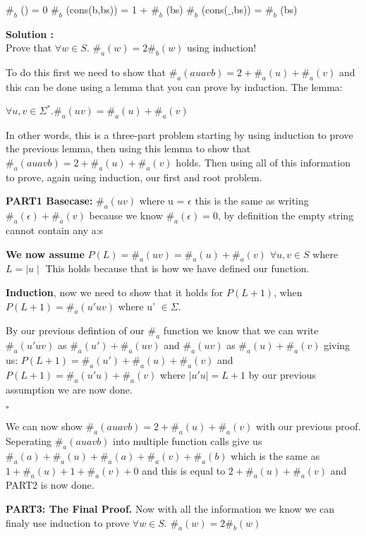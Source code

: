 \documentclass{article}
\newcounter{problem}
\newcounter{solution}
\newcommand\ASolution{%
  \stepcounter{solution}%
  \textbf{Solution \thesolution:}\\%
}
\begin{document}
$\#_b$ ()              = 0 \newline
$\#_b$ (cons(b,bs))    = 1 + $\#_b$ (bs) \newline
$\#_b$ (cons($\_$,bs)) = $\#_b$ (bs)

\ASolution Prove that $\forall w \in S$. $ \#_a (w) = 2\#_b (w)$ using induction!

To do this first we need to show that $\#_a (auavb) = 2 + \#_a(u) + \#_a(v)$ and this can be done using a lemma that you can prove by induction. The lemma: 
\begin{center}
    $\forall u,v \in \Sigma^*. \#_a (uv) = \#_a(u) + \#_a(v)$
\end{center}

In other words, this is a three-part problem starting by using induction to prove the previous lemma, then using this lemma to show that $\#_a (auavb) = 2 + \#_a(u) + \#_a(v)$ holds. Then using all of this information to prove, again using induction, our first and root problem.

\textbf{PART1 Basecase:} \newline
$\#_a (uv)$ where u = $\epsilon$ this is the same as writing $\#_a(\epsilon) + 
\#_a(v)$ because we know $\#_a(\epsilon) = 0$, by definition the empty string 
cannot contain any a:s

\textbf{We now assume} $P(L) = \#_a (uv) = \#_a (u) + \#_a (v)$ $\forall u,v \in S$ where $L = \mid u \mid$ This holds because that is how we have defined our function.

\textbf{Induction}, now we need to show that it holds for $P(L+1)$, when $P(L+1) = \#_a (u'uv)$ where u' $\in \Sigma$.

By our previous defintion of our $\#_a$ function we know that we can write 
$\#_a(u'uv)$ as $\#_a(u') + \#_a(uv)$ and $\#_a(uv)$ as $\#_a(u) + \#_a(v)$ giving 
us: $P(L+1) = \#_a(u') + \#_a(u) + \#_a(v)$ and $P(L+1) = \#_a(u'u) + \#_a(v)$ 
where $\mid u'u \mid = L+1$ by our previous assumption we are now done. 

\hfill
$\square$

We can now show $\#_a (auavb) = 2 + \#_a(u) + \#_a(v)$ with our previous proof.
Seperating $\#_a (auavb)$ into multiple function calls give us $\#_a(a) + \#_a(u) +
\#_a(a) + \#_a(v) + \#_a(b)$ which is the same as $1 + \#_a(u) + 1 + \#_a (v) + 0$ 
and this is equal to $2 + \#_a(u) + \#_a(v)$ and PART2 is now done.
\newpage

\textbf{PART3: The Final Proof.}
Now with all the information we know we can finaly use induction to prove $\forall w \in S$. $ \#_a (w) = 2\#_b (w)$
\end{document}
